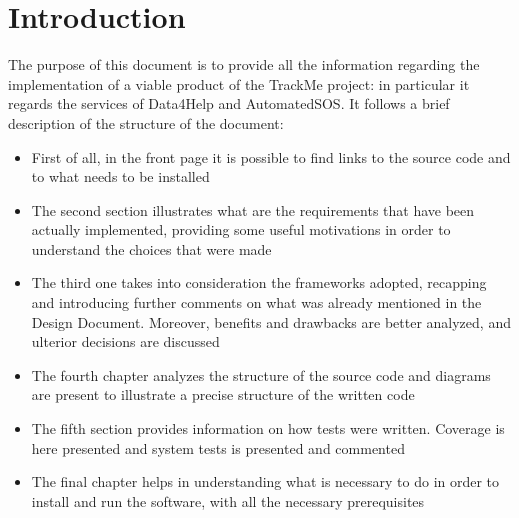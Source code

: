 \section{Introduction}
The purpose of this document is to provide all the information regarding the implementation of a viable product of the TrackMe project: in
particular it regards the services of Data4Help and AutomatedSOS. 
It follows a brief description of the structure of the document:
\begin{itemize}
\item First of all, in the front page it is possible to find links to the source code and to what needs to be installed
\item The second section illustrates what are the requirements that have been actually implemented, providing some useful motivations
in order to understand the choices that were made 
\item The third one takes into consideration the frameworks adopted, recapping and introducing further comments on what was already
mentioned in the Design Document. Moreover, benefits and drawbacks are better analyzed, and ulterior decisions are discussed
\item The fourth chapter analyzes the structure of the source code and diagrams are present to illustrate a precise structure of
the written code 
\item The fifth section provides information on how tests were written. Coverage is here presented and system tests is presented and commented
\item The final chapter helps in understanding what is necessary to do in order to install and run the software, with all the necessary prerequisites 
\end{itemize}
